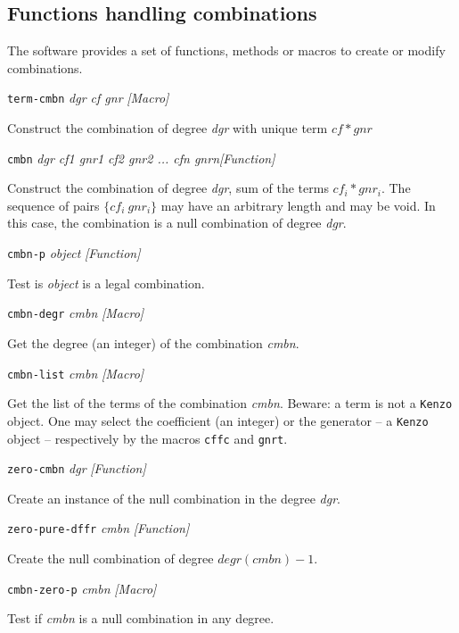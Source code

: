 \subsection {Functions handling  combinations}

The software provides a set of functions, methods or macros to create or modify
combinations.
\vskip 0.45cm
{\parindent=0mm
{\leftskip=5mm
{\tt term-cmbn} {\em dgr cf gnr} \hfill {\em [Macro]}\par}
{\leftskip=15mm
Construct the combination of degree {\em dgr} with unique term $cf * gnr$ \par}
{\leftskip=5mm
{\tt cmbn} {\em dgr cf1 gnr1 cf2 gnr2 ... cfn gnrn}\hfill {\em [Function]} \par}
{\leftskip=15mm
Construct the combination of degree {\em dgr}, sum of the terms $cf_i *  gnr_i$. The sequence of pairs
$\lbrace cf_i\  gnr_i \rbrace$ may have an arbitrary length and  may be void. In this case,  the combination
is a null combination of degree {\em dgr}.  \par}
{\leftskip=5mm
{\tt cmbn-p} {\em object} \hfill {\em [Function]}\par}
{\leftskip=15mm
Test is {\em object} is a legal combination. \par}
{\leftskip=5mm
{\tt cmbn-degr} {\em cmbn}   \hfill {\em [Macro]} \par}
{\leftskip=15mm
Get the degree (an integer) of the combination {\em cmbn}. \par}
{\leftskip=5mm
{\tt cmbn-list} {\em cmbn}   \hfill {\em [Macro]} \par}
{\leftskip=15mm
Get the list of the terms  of the combination {\em cmbn}. Beware: a term is not a {\tt Kenzo} object.
One may select the coefficient (an integer) or the generator -- a {\tt Kenzo} object --
respectively by the macros {\tt cffc} and {\tt gnrt}. \par}
{\leftskip=5mm
{\tt zero-cmbn} {\em dgr}   \hfill {\em [Function]} \par}
{\leftskip=15mm
Create an instance of the null combination in the degree {\em dgr}. \par}
{\leftskip=5mm
{\tt zero-pure-dffr} {\em cmbn} \hfill {\em [Function]} \par}
{\leftskip=15mm
Create  the null combination of degree $degr(cmbn) - 1$. \par}
{\leftskip=5mm
{\tt cmbn-zero-p} {\em cmbn} \hfill {\em [Macro]}\par}
{\leftskip=15mm
Test if {\em cmbn} is a null combination in any degree. \par}
}
